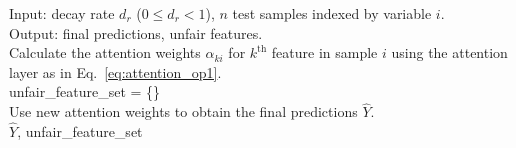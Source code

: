 

\begin{algorithm}[h]
\SetAlgoLined
Input: decay rate $d_r$ ($0 \leq d_r <1$), $n$ test samples indexed by variable $i$. \\
Output: final predictions, unfair features. \\
Calculate the attention weights $\alpha_{ki}$ for $k^{\text{th}}$ feature in sample $i$ using the attention layer as in Eq.~\ref{eq:attention_op1}.\\
{unfair\_feature\_set} = \{\} \\
Use new attention weights 
to obtain the final predictions $\hat Y$. \\
\Return $\hat Y$,  {unfair\_feature\_set}
 \caption{Bias Mitigation with Attention}
 \label{mitig_alg}
\end{algorithm}

